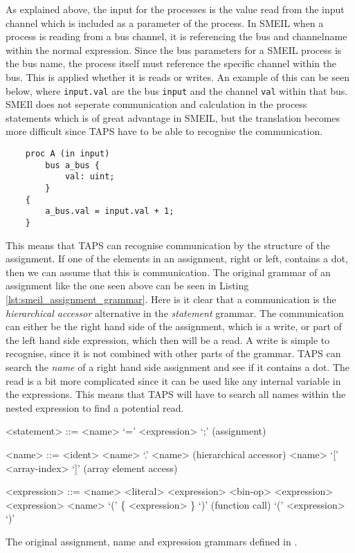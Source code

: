 As explained above, the input for the \cspm{} processes is the value read from the input channel which is included as a parameter of the process.
In SMEIL when a process is reading from a bus channel, it is referencing the bus and channelname within the normal expression. Since the bus parameters for a SMEIL process is the bus name, the process itself must reference the specific channel within the bus. This is applied whether it is reads or writes.
An example of this can be seen below, where \texttt{input.val} are the bus \texttt{input} and the channel \texttt{val} within that bus. SMEIl does not seperate communication and calculation in the process statements which is of great advantage in SMEIL, but the translation becomes more difficult since TAPS have to be able to recognise the communication.
\begin{verbatim}
    proc A (in input)
        bus a_bus {
            val: uint;
        }
    {
        a_bus.val = input.val + 1;
    }
\end{verbatim}

This means that TAPS can recognise communication by the structure of the assignment. If one of the elements in an assignment, right or left, contains a dot, then we can assume that this is communication. The original grammar of an assignment like the one seen above can be seen in Listing \ref{lst:smeil_assignment_grammar}. Here is it clear that a communication is the \textit{hierarchical accessor} alternative in the \textit{statement} grammar. The communication can either be the right hand side of the assignment, which is a write, or part of the left hand side expression, which then will be a read. A write is simple to recognise, since it is not combined with other parts of the grammar. TAPS can search the \textit{name} of a right hand side assignment and see if it contains a dot. The read is a bit more complicated since it can be used like any internal variable in the expressions. This means that TAPS will have to search all names within the nested expression to find a potential read.
\begin{listing}
    \begin{grammar}
      <statement> ::= <name> `=' <expression> `;' (assignment)

      <name> ::= <ident>
  \alt <name> `.' <name> (hierarchical accessor)
  \alt <name> `[' <array-index> `]' (array element access)

  <expression> ::= <name>
  \alt <literal>
  \alt <expression> <bin-op> <expression>
   <expression>
  \alt <name> `(' \{ <expression> \}  `)' (function call)
  \alt `(' <expression> `)'


    \end{grammar}
    \caption{The original assignment, name and expression grammars defined in \cite{Asheim2018}.}
\end{listing}


